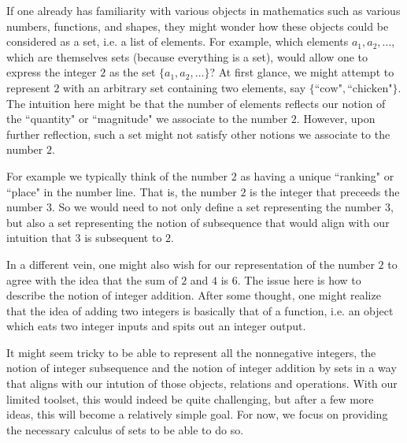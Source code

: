 \documentclass{book}
\begin{document}
	If one already has familiarity with various objects in mathematics such as various numbers, functions, and shapes, they might wonder how these objects could be considered as a set, i.e. a list of elements. For example, which elements $a_1, a_2, \ldots$, which are themselves sets (because everything is a set), would allow one to express the integer $2$ as the set $\{a_1, a_2, \ldots\}$? At first glance, we might attempt to represent $2$ with an arbitrary set containing two elements, say $\{\text{``cow"}, \text{``chicken"}\}$. The intuition here might be that the number of elements reflects our notion of the ``quantity" or ``magnitude" we associate to the number $2$. However, upon further reflection, such a set might not satisfy other notions we associate to the number $2$. 
	
	For example we typically think of the number $2$ as having a unique ``ranking" or ``place" in the number line. That is, the number $2$ is the integer that preceeds the number $3$. So we would need to not only define a set representing the number $3$, but also a set representing the notion of subsequence that would align with our intuition that $3$ is subsequent to $2$. 
	
	In a different vein, one might also wish for our representation of the number $2$ to agree with the idea that the sum of $2$ and $4$ is $6$. The issue here is how to describe the notion of integer addition. After some thought, one might realize that the idea of adding two integers is basically that of a function, i.e. an object which eats two integer inputs and spits out an integer output. 
	
	It might seem tricky to be able to represent all the nonnegative integers, the notion of integer subsequence and the notion of integer addition by sets in a way that aligns with our intution of those objects, relations and operations. With our limited toolset, this would indeed be quite challenging, but after a few more ideas, this will become a relatively simple goal. For now, we focus on providing the necessary calculus of sets to be able to do so. 
	
\end{document}
